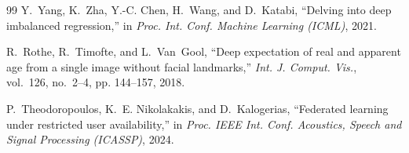 \documentclass{article}
\theoremstyle{definition}
\begin{document}
\begin{thebibliography}{99}
Y.~Yang, K.~Zha, Y.-C. Chen, H.~Wang, and D.~Katabi, ``Delving into deep
imbalanced regression,'' in \emph{Proc. Int. Conf. Machine Learning (ICML)},
2021.

R.~Rothe, R.~Timofte, and L.~Van~Gool, ``Deep expectation of real and apparent
age from a single image without facial landmarks,'' \emph{Int. J. Comput.
Vis.}, vol.~126, no.~2--4, pp. 144--157, 2018.

P.~Theodoropoulos, K.~E. Nikolakakis, and D.~Kalogerias, ``Federated learning
under restricted user availability,'' in \emph{Proc. IEEE Int. Conf. Acoustics,
Speech and Signal Processing (ICASSP)}, 2024.

\end{thebibliography}
\end{document}
